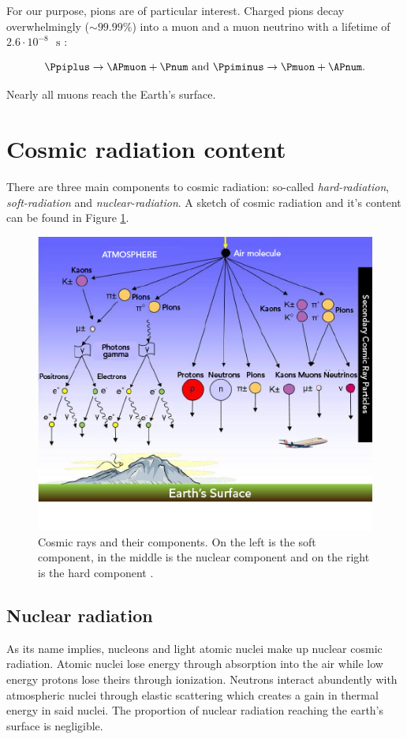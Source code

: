 For our purpose, pions are of particular interest. Charged pions decay overwhelmingly ($\sim 99.99\%$) into a muon and a muon neutrino with a lifetime of $2.6 \cdot 10^{-8} \text{ } \si{\second}$ \cite{Tanabashi:2018oca}:

\begin{equation*}
\Ppiplus \rightarrow \APmuon + \Pnum \text{ and } \Ppiminus \rightarrow \Pmuon + \APnum.
\end{equation*}

Nearly all muons reach the Earth's surface.

\section{Cosmic radiation content}

There are three main components to cosmic radiation: so-called \textit{hard-radiation}, \textit{soft-radiation} and \textit{nuclear-radiation}. A sketch of cosmic radiation and it's content can be found in Figure \ref{fig:cos}.

\begin{figure}[htbp]
\centering
\includegraphics[width=0.7\linewidth]{./fig/Cosmic_ray_scattering.png}
\caption{Cosmic rays and their components. On the left is the soft component, in the middle is the nuclear component and on the right is the hard component \cite{LTSCA}.}
\label{fig:cos}
\end{figure}

\subsection{Nuclear radiation}

As its name implies, nucleons and light atomic nuclei make up nuclear cosmic radiation. Atomic nuclei lose energy through absorption into the air while low energy protons lose theirs through ionization. Neutrons interact abundently with atmospheric nuclei through elastic scattering which creates a gain in thermal energy in said nuclei. The proportion of nuclear radiation reaching the earth's surface is negligible.

